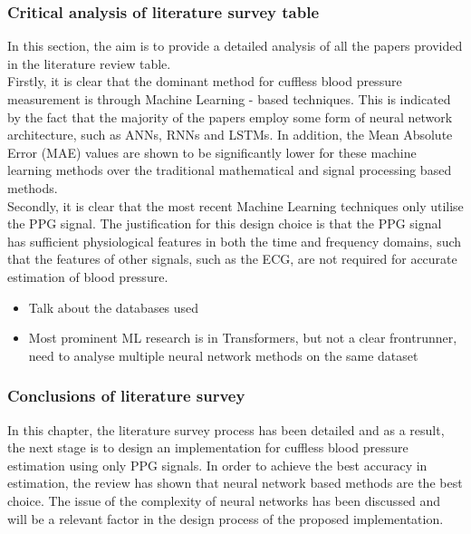 \subsubsection{Critical analysis of literature survey table}
In this section, the aim is to provide a detailed analysis of all the papers provided 
in the literature review table. \\ \newline \noindent Firstly, it is clear that the dominant method for cuffless 
blood pressure measurement is through Machine Learning - based techniques. This is indicated by the 
fact that the majority of the papers employ some form of neural network architecture, such as ANNs, RNNs 
and LSTMs. In addition, the Mean Absolute Error (MAE) values are shown to be significantly lower 
for these machine learning methods over the traditional mathematical and signal processing based 
methods.\\ \newline \noindent Secondly, it is clear that the most recent Machine Learning techniques 
only utilise the PPG signal. The justification for this design choice is that the PPG signal has sufficient 
physiological features in both the time and frequency domains, such that the features of other signals, such as the ECG, 
are not required for accurate estimation of blood pressure. 

\begin{itemize}
  \item Talk about the databases used
  \item Most prominent ML research is in Transformers, but not a clear frontrunner, need to analyse multiple neural network methods on the same dataset
\end{itemize}

\subsubsection{Conclusions of literature survey}
In this chapter, the literature survey process has been detailed and as a result, the next stage is to 
design an implementation for cuffless blood pressure estimation using only PPG signals. In order to achieve 
the best accuracy in estimation, the review has shown that neural network based methods are the best choice. 
The issue of the complexity of neural networks has been discussed and will be a relevant factor in the design 
process of the proposed implementation.
